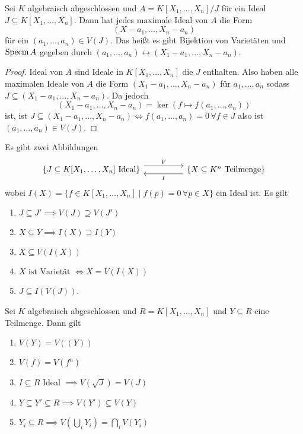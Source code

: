 \begin{Satz}
    Sei \(K\) algebraisch abgeschlossen und \(A=K[X_1,\dots,X_n]/J\) für ein Ideal \(J\subseteq K[X_1,\dots,X_n]\).
    Dann hat jedes maximale Ideal von \(A\) die Form \[(X-a_1,\dots,X_n-a_n)\] für ein \((a_1,\dots,a_n)\in V(J)\).
    Das heißt es gibt Bijektion von Varietäten und \(\operatorname{Specm} A\) gegeben durch \((a_1,\dots,a_n)\leftrightarrow (X_1-a_1,\dots,X_n-a_n)\).
\end{Satz}
\begin{proof}
    Ideal von \(A\) sind Ideale in \(K[X_1,\dots,X_n]\) die \(J\) enthalten. Also haben alle maximalen Ideale von \(A\) die Form \((X_1-a_1,\dots,X_n-a_n)\) für \(a_1,\dots,a_n\) sodass \(J\subseteq (X_1-a_1,\dots,X_n-a_n)\). Da jedoch 
    \[(X_1-a_1,\dots,X_n-a_n)=\ker(f\mapsto f(a_1,\dots,a_n))\] ist, ist \(J\subseteq (X_1-a_1,\dots,X_n-a_n)\iff f(a_1,\dots,a_n)=0\, \forall f\in J\) also ist \((a_1,\dots,a_n)\in V(J)\).
\end{proof}
\begin{Bem}
    Es gibt zwei Abbildungen
    $$%
\begin{tikzcd}
{\{J\subseteq K[X_1,\dots,X_n] \text{ Ideal}\}} \arrow[rr, "V", shift left=2] &  & \{X\subseteq K^n\text{ Teilmenge}\} \arrow[ll, "I", shift left=2]
\end{tikzcd}$$
wobei \(I(X)=\{f\in K[X_1,\dots,X_n]\mid f(p)=0\, \forall p\in X\}\) ein Ideal ist.
Es gilt 
\begin{enumerate}
    \item \(J\subseteq J'\implies V(J)\supseteq V(J')\)
    \item \(X\subseteq Y\implies I(X)\supseteq I(Y)\)
    \item \(X\subseteq V(I(X))\)
    \item \(X \text{ ist Varietät } \iff X=V(I(X))\)
    \item \(J\subseteq I(V(J))\).
\end{enumerate}
\end{Bem}
\begin{Bem}
    Sei \(K\) algebraisch abgeschlossen und \(R=K[X_1,\dots,X_n]\) und \(Y\subseteq R\) eine Teilmenge. Dann gilt
    \begin{enumerate}
        \item \(V(Y)=V((Y))\)
        \item \(V(f)=V(f^n)\)
        \item \(I\subseteq R\) Ideal \(\implies V(\sqrt{J})=V(J)\)
        \item \(Y\subseteq Y'\subseteq R\implies V(Y')\subseteq V(Y)\)
        \item \(Y_i\subseteq R\implies V(\bigcup_iY_i)=\bigcap_iV(Y_i)\)
        
    \end{enumerate}
\end{Bem}
